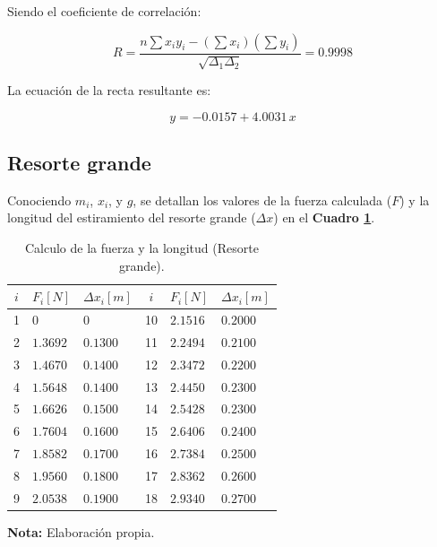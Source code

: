 \documentclass[letter,11pt]{article}
\newcommand{\source}[1]{\vspace{-11pt} \caption*{\small{\textbf{Nota:} {#1}}}}
\begin{document}
Siendo el coeficiente de correlación:

\begin{equation*}
    R = \frac{n \sum x_i y_i - (\sum x_i)(\sum y_i)}{\sqrt{\Delta_1 \Delta_2}}
      = 0.9998
\end{equation*}
\vspace{0.10cm}

La ecuación de la recta resultante es:

\begin{equation*}
    y = -0.0157 + 4.0031\,x
\end{equation*}
\vspace{0.10cm}

\subsection{Resorte grande}

Conociendo $m_i$, $x_i$, y $g$, se detallan los valores de la fuerza calculada
($F$) y la longitud del estiramiento del resorte grande ($\Delta x$) en el
\textbf{Cuadro \ref{cuadro5}}.

\begin{table}[!h]
\begin{center}
\begin{tabular}{|c||>{\centering}m{2.0cm}<{\centering}
                  |>{\centering}m{2.0cm}<{\centering}|
                |c||>{\centering}m{2.0cm}<{\centering}
                  |>{\centering}m{2.0cm}<{\centering}|}
\hline
$i$ & $F_i [N]$ & $\Delta x_i [m]$ & $i$ & $F_i [N]$ & $\Delta x_i [m]$
    \tabularnewline \hline \hline
 1 & $     0$ & $     0$ & 10 & $2.1516$ & $0.2000$\tabularnewline \hline
 2 & $1.3692$ & $0.1300$ & 11 & $2.2494$ & $0.2100$\tabularnewline \hline
 3 & $1.4670$ & $0.1400$ & 12 & $2.3472$ & $0.2200$\tabularnewline \hline
 4 & $1.5648$ & $0.1400$ & 13 & $2.4450$ & $0.2300$\tabularnewline \hline
 5 & $1.6626$ & $0.1500$ & 14 & $2.5428$ & $0.2300$\tabularnewline \hline
 6 & $1.7604$ & $0.1600$ & 15 & $2.6406$ & $0.2400$\tabularnewline \hline
 7 & $1.8582$ & $0.1700$ & 16 & $2.7384$ & $0.2500$\tabularnewline \hline
 8 & $1.9560$ & $0.1800$ & 17 & $2.8362$ & $0.2600$\tabularnewline \hline
 9 & $2.0538$ & $0.1900$ & 18 & $2.9340$ & $0.2700$\tabularnewline \hline
\end{tabular}
\caption{Calculo de la fuerza y la longitud (Resorte grande).}
\label{cuadro5}
\source{Elaboración propia.}
\end{center}
\end{table}
\end{document}
